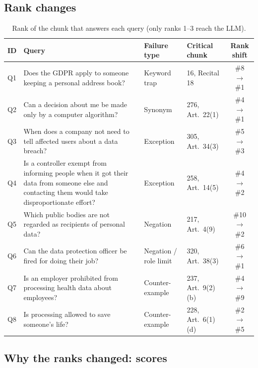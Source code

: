 \documentclass[11pt,a4paper]{article}
\begin{document}
\subsection{Rank changes}

\begin{table}[H]
\centering\small
\begin{tabularx}{\linewidth}{l L l l c}
\toprule
\textbf{ID} & \textbf{Query} & \textbf{Failure type} & \textbf{Critical chunk} & \textbf{Rank shift} \\
\midrule
Q1 & Does the GDPR apply to someone keeping a personal address book? & Keyword trap & 16, Recital 18 & \#8 $\rightarrow$ \#1 \\
Q2 & Can a decision about me be made only by a computer algorithm? & Synonym & 276, Art.\ 22(1) & \#4 $\rightarrow$ \#1 \\
Q3 & When does a company not need to tell affected users about a data breach? & Exception & 305, Art.\ 34(3) & \#5 $\rightarrow$ \#3 \\
Q4 & Is a controller exempt from informing people when it got their data from someone else and contacting them would take disproportionate effort? & Exception & 258, Art.\ 14(5) & \#4 $\rightarrow$ \#2 \\
Q5 & Which public bodies are not regarded as recipients of personal data? & Negation & 217, Art.\ 4(9) & \#10 $\rightarrow$ \#2 \\
Q6 & Can the data protection officer be fired for doing their job? & Negation / role limit & 320, Art.\ 38(3) & \#6 $\rightarrow$ \#1 \\
\midrule
Q7 & Is an employer prohibited from processing health data about employees? & Counter-example & 237, Art.\ 9(2)(b) & \#4 $\rightarrow$ \#9 \\
Q8 & Is processing allowed to save someone's life? & Counter-example & 228, Art.\ 6(1)(d) & \#2 $\rightarrow$ \#5 \\
\bottomrule
\end{tabularx}
\caption{Rank of the chunk that answers each query (only ranks 1--3 reach the LLM).}
\end{table}

\subsection{Why the ranks changed: scores}
\end{document}
